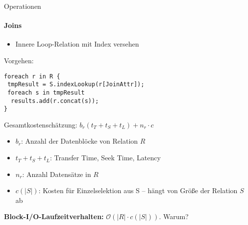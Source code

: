 \begin{frame}[fragile]{Operationen}
\framesubtitle{Joins}
\begin{itemize}
	\item Innere Loop-Relation mit Index versehen\\[4pt]
\end{itemize}
\pause
Vorgehen:
\begin{lstlisting}
foreach r in R {
 tmpResult = S.indexLookup(r[JoinAttr]);
 foreach s in tmpResult 
  results.add(r.concat(s)); 
}
\end{lstlisting}
\pause
Gesamtkostenschätzung: $b_r(t_T+t_S+t_L)+n_r \cdot c $ 
\begin{itemize}
	\item $b_r$: Anzahl der Datenblöcke von Relation $R$
	\item $t_T + t_S + t_L$: Transfer Time, Seek Time, Latency 
	\item $n_r$: Anzahl Datens\"atze in $R$ 
	\item $c(|S|)$: Kosten für Einzelselektion aus S -- h\"angt von Gr\"o\ss e der Relation $S$ ab
\end{itemize}
\pause
\textbf{Block-I/O-Laufzeitverhalten:} $\mathcal{O}(|R|\cdot c(|S|))$. Warum?
\end{frame}


